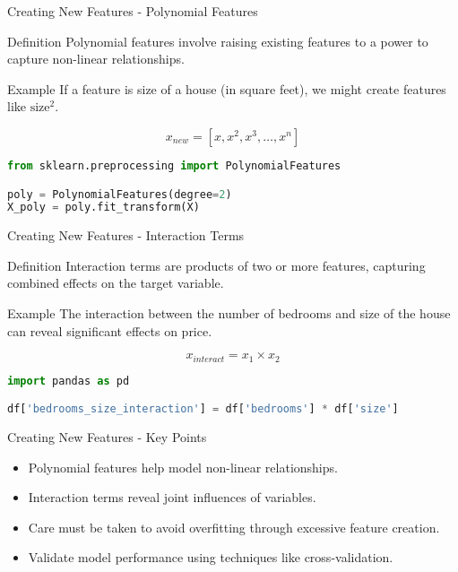 \documentclass[aspectratio=169]{beamer}
\begin{document}
\begin{frame}[fragile]{Creating New Features - Polynomial Features}
    \begin{block}{Definition}
        Polynomial features involve raising existing features to a power to capture non-linear relationships.
    \end{block}
    
    \begin{block}{Example}
        If a feature is size of a house (in square feet), we might create features like $\text{size}^2$.
    \end{block}

    \begin{equation}
        x_{new} = [x, x^2, x^3, \ldots, x^n]
    \end{equation}

    \begin{lstlisting}[language=Python]
from sklearn.preprocessing import PolynomialFeatures

poly = PolynomialFeatures(degree=2)
X_poly = poly.fit_transform(X)
    \end{lstlisting}
\end{frame}

\begin{frame}[fragile]{Creating New Features - Interaction Terms}
    \begin{block}{Definition}
        Interaction terms are products of two or more features, capturing combined effects on the target variable.
    \end{block}
    
    \begin{block}{Example}
        The interaction between the number of bedrooms and size of the house can reveal significant effects on price.
    \end{block}

    \begin{equation}
        x_{interact} = x_1 \times x_2
    \end{equation}
    
    \begin{lstlisting}[language=Python]
import pandas as pd

df['bedrooms_size_interaction'] = df['bedrooms'] * df['size']
    \end{lstlisting}
\end{frame}

\begin{frame}[fragile]{Creating New Features - Key Points}
    \begin{itemize}
        \item Polynomial features help model non-linear relationships.
        \item Interaction terms reveal joint influences of variables.
        \item Care must be taken to avoid overfitting through excessive feature creation.
        \item Validate model performance using techniques like cross-validation.
    \end{itemize}
\end{frame}
\end{document}
